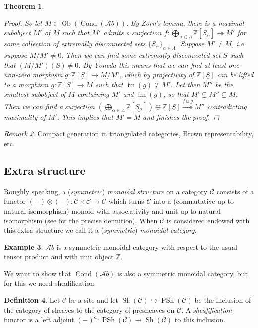\documentclass[11pt,A4]{article}
\theoremstyle{plain}
\newtheorem{thm}{Theorem}[section]
\theoremstyle{definition}
\newtheorem{defn}[thm]{Definition}
\newtheorem{exa}[thm]{Example}
\theoremstyle{remark}
\newtheorem{rem}[thm]{Remark}
\newcommand{\Z}{\mathbb{Z}}
\newcommand{\1}{\mathbbm{1}}
\newcommand{\C}{\mathscr{C}}
\newcommand{\Ab}{\mathscr{A}b}
\DeclareMathOperator{\Cond}{Cond}
\DeclareMathOperator{\Ob}{Ob}
\DeclareMathOperator{\im}{im}
\DeclareMathOperator{\PSh}{PSh}
\DeclareMathOperator{\Sh}{Sh}
\renewcommand{\u}[1]{\underline{#1}}
\newcommand{\ot}{\otimes}
\newcommand{\op}{\oplus}
\begin{document}
\begin{thm}
\begin{proof}
	So let $M\in \Ob(\Cond(\Ab))$.
	By Zorn's lemma, there is a maximal subobject $M'$ of $M$ such that $M'$ admits a surjection $f\colon \bigoplus_{\alpha\in \Lambda}\Z[\u{S_{\alpha}}]\twoheadrightarrow M'$ for some collection of extremally disconnected sets $\{S_{\alpha}\}_{\alpha\in \Lambda}$.
	Suppose $M'\neq M$, i.e. suppose $M/M'\neq 0$.
	Then we can find some extremally disconnected set $S$ such that $(M/M')(S)\neq 0$.
	By Yoneda this means that we can find at least one non-zero morphism $\bar{g}\colon \Z[\u{S}]\to M/M'$, which by projectivity of $\Z[\u{S}]$ can be lifted to a morphism $g\colon \Z[\u{S}]\to M$ such that $\im(g)\not\subseteq M'$.
	Let then $M''$ be the smallest subobject of $M$ containing $M'$ and $\im(g)$, so that $M'\subsetneq M''\subsetneq M$.
	Then we can find a surjection $(\bigoplus_{\alpha\in \Lambda} \Z[\u{S_{\alpha}}])\op \Z[\u{S}]\overset{f\sqcup g}{\twoheadrightarrow} M''$ contradicting maximality of $M'$.
	This implies that $M'=M$ and finishes the proof.
    \end{proof}
\end{thm}

\begin{rem}
    Compact generation in triangulated categories, Brown representability, etc.
\end{rem}

\subsection{Extra structure}

Roughly speaking, a (\textit{symmetric}) \textit{monoidal structure} on a category $\C$ consists of a functor $(-)\ot(-)\colon \C\times \C\to \C$ which turns $\C$ into a (commutative up to natural isomorphism) monoid with associativity and unit up to natural isomorphism (see \cite{nlab:monoidal_category} for the precise definition).
When $\C$ is considered endowed with this extra structure we call it a (\textit{symmetric}) \textit{monoidal category}.

\begin{exa}
    $\Ab$ is a symmetric monoidal category with respect to the usual tensor product and with unit object $\Z$.
\end{exa}

We want to show that $\Cond(\Ab)$ is also a symmetric monoidal category, but for this we need sheafification:

\begin{defn}
    Let $\C$ be a site and let $\Sh(\C)\hookrightarrow \PSh(\C)$ be the inclusion of the category of sheaves to the category of presheaves on $\C$. 
    A \textit{sheafification} functor is a left adjoint $(-)^{a}\colon \PSh(\C)\to \Sh(\C)$ to this inclusion.
\end{defn}
\end{document}
